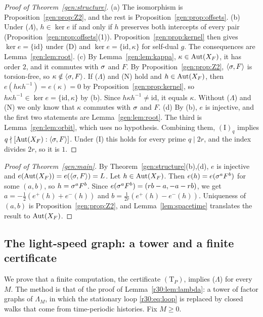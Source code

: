 \begin{proof}[Proof of Theorem~\ref{gen:structure}]
(a) The isomorphism is Proposition~\ref{gen:prop:Z2}, and the rest is Proposition~\ref{gen:prop:offsets}.
(b) Under ($\Lambda$), $h\in\ker e$ if and only if $h$ preserves both intercepts of every pair (Proposition~\ref{gen:prop:offsets}(1)). Proposition~\ref{gen:prop:kernel} then gives $\ker e=\{\mathrm{id}\}$ under (D) and $\ker e=\{\mathrm{id},\kappa\}$ for self-dual $g$. The consequences are Lemma~\ref{gen:lem:root}.
(c) By Lemma~\ref{gen:lem:kappa}, $\kappa\in\operatorname{Aut}(X_F)$, it has order $2$, and it commutes with $\sigma$ and $F$. By Proposition~\ref{gen:prop:Z2}, $\langle\sigma,F\rangle$ is torsion-free, so $\kappa\notin\langle\sigma,F\rangle$. If ($\Lambda$) and (N) hold and $h\in\operatorname{Aut}(X_F)$, then $e(h\kappa h^{-1})=e(\kappa)=0$ by Proposition~\ref{gen:prop:kernel}, so $h\kappa h^{-1}\in\ker e=\{\mathrm{id},\kappa\}$ by (b). Since $h\kappa h^{-1}\ne\mathrm{id}$, it equals $\kappa$. Without ($\Lambda$) and (N) we only know that $\kappa$ commutes with $\sigma$ and $F$.
(d) By (b), $e$ is injective, and the first two statements are Lemma~\ref{gen:lem:root}. The third is Lemma~\ref{gen:lem:orbit}, which uses no hypothesis. Combining them, $(\mathrm{I})_q$ implies $q\nmid[\operatorname{Aut}(X_F):\langle\sigma,F\rangle]$. Under (I) this holds for every prime $q\mid2r$, and the index divides $2r$, so it is $1$.
\end{proof}

\begin{proof}[Proof of Theorem~\ref{gen:main}]
By Theorem~\ref{gen:structure}(b),(d), $e$ is injective and $e(\operatorname{Aut}(X_F))=e(\langle\sigma,F\rangle)=L$. Let $h\in\operatorname{Aut}(X_F)$. Then $e(h)=e(\sigma^aF^b)$ for some $(a,b)$, so $h=\sigma^aF^b$. Since $e(\sigma^aF^b)=(rb-a,-a-rb)$, we get $a=-\frac12(e^+(h)+e^-(h))$ and $b=\frac1{2r}(e^+(h)-e^-(h))$. Uniqueness of $(a,b)$ is Proposition~\ref{gen:prop:Z2}, and Lemma~\ref{lem:spacetime} translates the result to $\operatorname{Aut}(X_F)$.
\end{proof}

\subsection{The light-speed graph: a tower and a finite certificate}\label{gen:sec:tower}

We prove that a finite computation, the certificate $(\mathrm T_P)$, implies ($\Lambda$) for every $M$. The method is that of the proof of Lemma~\ref{r30:lem:lambda}: a tower of factor graphs of $\Lambda_M$, in which the stationary loop \eqref{r30:eq:loop} is replaced by closed walks that come from time-periodic histories. Fix $M\ge0$.

